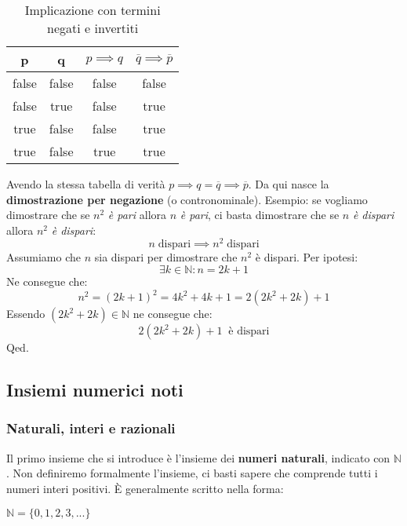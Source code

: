 \begin{table}[H]
\centering
\begin{tabular}{|cc|c|c|}
\hline
p & q & \multicolumn{1}{l|}{$p \implies q$} & \multicolumn{1}{l|}{$\overline{q} \implies \overline{p}$} \\ \hline
{\color[HTML]{000000} false} & {\color[HTML]{000000} false} & false & false \\
{\color[HTML]{000000} false} & {\color[HTML]{000000} true} & false & true \\
{\color[HTML]{000000} true} & {\color[HTML]{000000} false} & false & true \\
true & false & true & true \\ \hline
\end{tabular}
\caption{Implicazione con termini negati e invertiti}
\end{table}

Avendo la stessa tabella di verità $p \implies q = \overline{q} \implies \overline{p}$. Da qui nasce la \textbf{dimostrazione per negazione} (o contronominale). Esempio: se vogliamo dimostrare che se $n^2$ \textit{è pari} allora $n$ \textit{è pari}, ci basta dimostrare che se $n$ \textit{è dispari} allora $n^2$ \textit{è dispari}:
\begin{equation*}
	n \; \text{dispari} \implies n^2 \; \text{dispari}
\end{equation*}
Assumiamo che $n$ sia dispari per dimostrare che $n^2$ è dispari. Per ipotesi:
\begin{equation*}
	\exists k \in \mathbb{N}: n = 2k + 1
\end{equation*}
Ne consegue che:
\begin{equation*}
	n^2 = (2k+1)^2 = 4k^2 + 4k + 1 = 2(2k^2 + 2k) + 1
\end{equation*}
Essendo $(2k^2 + 2k) \in \mathbb{N}$ ne consegue che:
\begin{equation*}
	2(2k^2 + 2k) + 1 \;\; \text{è dispari}
\end{equation*}
\hfill Qed.


\subsection{Insiemi numerici noti}

\subsubsection{Naturali, interi e razionali}

Il primo insieme che si introduce è l'insieme dei \textbf{numeri naturali}, indicato con $\mathbb{N}$. Non definiremo formalmente l'insieme, ci basti sapere che comprende tutti i numeri interi positivi. È generalmente scritto nella forma:
\begin{center}
    $\mathbb{N} = \{0, 1, 2, 3, ...\}$
\end{center}

